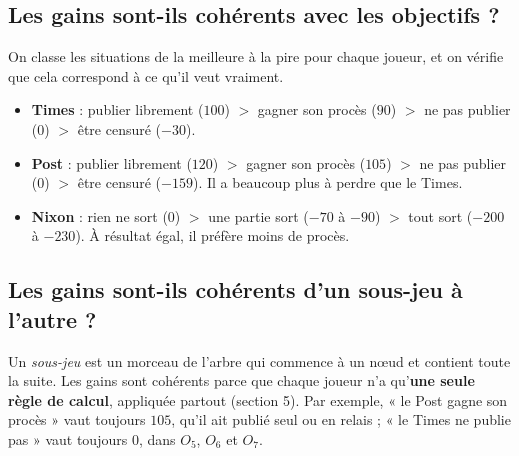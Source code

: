 \documentclass[11pt,a4paper]{article}
\theoremstyle{definition}
\begin{document}
\subsection{Les gains sont-ils cohérents avec les objectifs ?}
On classe les situations de la meilleure à la pire pour chaque joueur, et on vérifie que cela correspond à ce qu'il veut vraiment.
\begin{itemize}[leftmargin=*,itemsep=2pt]
\item \textbf{Times} : publier librement ($100$) $>$ gagner son procès ($90$) $>$ ne pas publier ($0$) $>$ être censuré ($-30$).
\item \textbf{Post} : publier librement ($120$) $>$ gagner son procès ($105$) $>$ ne pas publier ($0$) $>$ être censuré ($-159$). Il a beaucoup plus à perdre que le Times.
\item \textbf{Nixon} : rien ne sort ($0$) $>$ une partie sort ($-70$ à $-90$) $>$ tout sort ($-200$ à $-230$). À résultat égal, il préfère moins de procès.
\end{itemize}

\subsection{Les gains sont-ils cohérents d'un sous-jeu à l'autre ?}
Un \emph{sous-jeu} est un morceau de l'arbre qui commence à un nœud et contient toute la suite. Les gains sont cohérents parce que chaque joueur n'a qu'\textbf{une seule règle de calcul}, appliquée partout (section 5). Par exemple, « le Post gagne son procès » vaut toujours $105$, qu'il ait publié seul ou en relais ; « le Times ne publie pas » vaut toujours $0$, dans $O_5$, $O_6$ et $O_7$.
\end{document}

